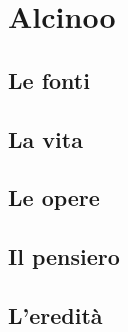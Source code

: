\chapter{Alcinoo}

\section{Le fonti}

\section{La vita}

\section{Le opere}

\section{Il pensiero}

\section{L'eredità}
